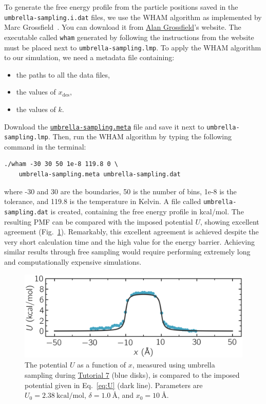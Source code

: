\documentclass[9pt,tutorial]{livecoms}
\newcommand{\flecmd}[1]{\textcolor{command}{\texttt{#1}}} %
\newcommand{\dwlcmd}[1]{\textcolor{download}{\texttt{#1}}} %
\newcommand{\filepath}{https://raw.githubusercontent.com/lammpstutorials/lammpstutorials-article/main/files/}
\begin{document}
To generate the free energy profile from the particle positions
saved in the \flecmd{umbrella-sampling.i.dat} files,
we use the WHAM algorithm as implemented by Marc Grossfield~\cite{grossfieldimplementation}.
You can download it from \href{http://membrane.urmc.rochester.edu/?page_id=126}{Alan Grossfield}'s
website.  The executable called \flecmd{wham} generated by following the instructions
from the website must be placed next to \flecmd{umbrella-sampling.lmp}.  To apply
the WHAM algorithm to our simulation, we need a metadata file containing:
\begin{itemize}
\item the paths to all the data files,
\item the values of $x_\text{des}$,
\item the values of $k$.
\end{itemize}
Download the \href{\filepath tutorial7/umbrella-sampling.meta}{\dwlcmd{umbrella-sampling.meta}} file
and save it next to \flecmd{umbrella-sampling.lmp}.  Then, run the WHAM algorithm
by typing the following command in the terminal:
\begin{lstlisting}
./wham -30 30 50 1e-8 119.8 0 \
    umbrella-sampling.meta umbrella-sampling.dat
\end{lstlisting}
where -30 and 30 are the boundaries, 50 is the number of bins, 1e-8 is the tolerance,
and 119.8 is the temperature in Kelvin.  A file called \flecmd{umbrella-sampling.dat} is created,
containing the free energy profile in kcal/mol.  The resulting PMF can be compared
with the imposed potential $U$, showing excellent agreement
(Fig.~\ref{fig:US-freenergy}).  Remarkably, this excellent agreement is achieved despite
the very short calculation time and the high value for the energy barrier.
Achieving similar results through free sampling would require performing extremely
long and computationally expensive simulations.

\begin{figure}
\centering
\includegraphics[width=\linewidth]{US-free-energy}
\caption{The potential $U$ as a function of $x$, measured using umbrella
sampling during \hyperref[umbrella-sampling-label]{Tutorial 7} (blue disks),
is compared to the imposed potential given in Eq.~\eqref{eq:U}
(dark line).  Parameters are $U_0 = 2.38~\text{kcal/mol}$, $\delta = 1.0~\text{\AA{}}$,
and $x_0 = 10~\text{\AA{}}$.}
\label{fig:US-freenergy}
\end{figure}
\end{document}
